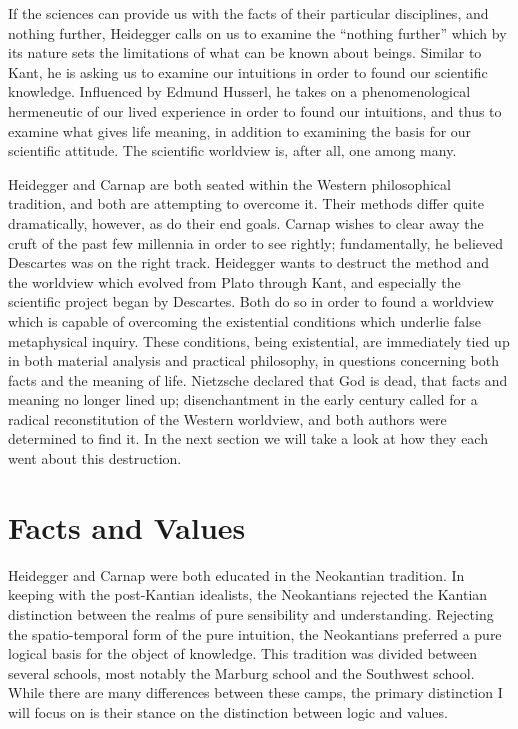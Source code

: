 \documentclass[leqno, 12pt]{turabian-researchpaper}
\begin{document}
	If the sciences can provide us with the facts of their particular disciplines,
	and nothing further, Heidegger calls on us to examine the \enquote{nothing further}
	which by its nature sets the limitations of what can be known about beings. Similar
	to Kant, he is asking us to examine our intuitions in order to found our
	scientific knowledge. Influenced by Edmund Husserl, he takes on a
	phenomenological hermeneutic of our lived experience in order to found our
	intuitions, and thus to examine what gives life meaning, in addition to
	examining the basis for our scientific attitude. The scientific worldview is,
	after all, one among many.

	Heidegger and Carnap are both seated within the Western philosophical tradition,
	and both are attempting to overcome it. Their methods differ quite dramatically,
	however, as do their end goals. Carnap wishes to clear away the cruft of the
	past few millennia in order to see rightly; fundamentally, he believed
	Descartes was on the right track. Heidegger wants to destruct the method and the
	worldview which evolved from Plato through Kant, and especially the scientific
	project began by Descartes. Both do so in order to found a worldview which is capable
	of overcoming the existential conditions which underlie false metaphysical inquiry.
	These conditions, being existential, are immediately tied up in both material
	analysis and practical philosophy, in questions concerning both facts and the meaning
	of life. Nietzsche declared that God is dead, that facts and meaning no longer
	lined up; disenchantment in the early  century called for a radical reconstitution
	of the Western worldview, and both authors were determined to find it. In the next
	section we will take a look at how they each went about this destruction.

	\section{Facts and Values}

	Heidegger and Carnap were both educated in the Neokantian tradition. In keeping
	with the post-Kantian idealists, the Neokantians rejected the Kantian
	distinction between the realms of pure sensibility and understanding. Rejecting
	the spatio-temporal form of the pure intuition, the Neokantians preferred a
	pure logical basis for the object of knowledge. \autocite[p28]{friedman2000} This
	tradition was divided between several schools, most notably the Marburg school
	and the Southwest school. While there are many differences between these camps,
	the primary distinction I will focus on is their stance on the distinction
	between logic and values.
\end{document}
